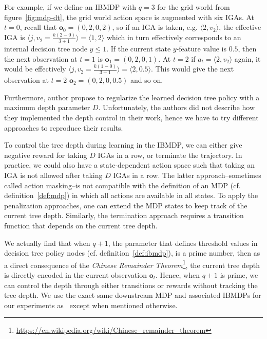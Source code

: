 For example, if we define an IBMDP with $q=3$ for the grid world from figure~\ref{fig:mdp-dt}, the grid world action space is augmented with six IGAs. 
At $t=0$, recall that $\boldsymbol{o}_0=(0, 2, 0, 2)$, so if an IGA is taken, e.g. $\langle 2, v_2\rangle$, the effective IGA is $\langle j, v_2=\frac{k(2-0)}{3+1}\rangle = \langle 1, 2 \rangle$ which in turn effectively corresponds to an internal decision tree node $y \leq 1$.
If the current state $y$-feature value is $0.5$, then the next observation at $t=1$ is $\boldsymbol{o}_1=(0, 2, 0, 1)$. At $t=2$ if $a_t=\langle 2, v_2 \rangle$ again, it would be effectively $\langle j, v_2=\frac{k(1-0)}{3+1}\rangle = \langle 2, 0.5 \rangle$. 
This would give the next observation at $t=2$ $\boldsymbol{o}_2=(0, 2, 0, 0.5)$ and so on. 

Furthermore, author propose to regularize the learned decision tree policy with a maximum depth parameter $D$.
Unfortunately, the authors did not describe how they implemented the depth control in their work, hence we have to try different approaches to reproduce their results.

To control the tree depth during learning in the IBMDP, we can either give negative reward for taking $D$ IGAs in a row, or terminate the trajectory.
In practice, we could also have a state-dependent action space such that taking an IGA is not allowed after taking $D$ IGAs in a row.
The latter approach--sometimes called action masking--is not compatible with the definition of an MDP (cf. definition~\ref{def:mdp}) in which all actions are available in all states. 
To apply the penalization approaches, one can extend the MDP states to keep track of the current tree depth.
Similarly, the termination approach requires a transition function that depends on the current tree depth.

We actually find that when $q+1$, the parameter that defines threshold values in decision tree policy nodes (cf. definition~\ref{def:ibmdp}), is a prime number, then as a direct consequence of the \textit{Chinese Remainder Theorem}\footnote{\url{https://en.wikipedia.org/wiki/Chinese_remainder_theorem}}, the current tree depth is directly encoded in the current observation $\boldsymbol{o}_t$. 
Hence, when $q+1$ is prime, we can control the depth through either transitions or rewards without tracking the tree depth.
We use the exact same downstream MDP and associated IBMDPs for our experiments as~\citep{topin2021iterative} except when mentioned otherwise.

